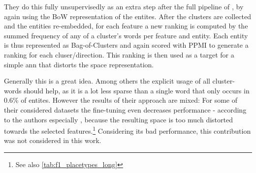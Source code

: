 They do this fully unsupervisedly as an extra step after the full pipeline of \cite{Derrac2015}, by again using the BoW representation of the entites. After the clusters are collected and the entities re-embedded, for each feature a new ranking is computed by the summed frequency of any of a cluster's words per feature and entity. Each entity is thus represented as Bag-of-Clusters and again scored with PPMI to generate a ranking for each cluser/direction. This ranking is then used as a target for a simple \gls{ann} that distorts the space representation.

Generally this is a great idea. Among others the explicit usage of all cluster-words should help, as it is a lot less sparse than a single word that only occurs in 0.6\% of entites. However the results of their approach are mixed: For some of their considered datasets the fine-tuning even decreases performance - according to the authors especially  \cite{Ager2018}, because the resulting space is too much distorted towards the selected features.\footnote{See also \autoref{tab:f1_placetypes_long}} Considering its bad performance, this contribution was not considered in this work.

\textcite{Alshaikh2020}

\todo

